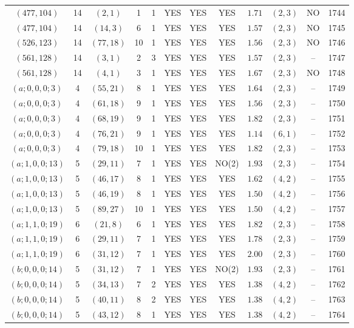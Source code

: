 \begin{longtable}{|c|c|c|c|c|c|c|c|c|c|c|c|}
$(477,104)$ & 14 & $(2,1)$ & 1 & 1 & YES & YES & YES & $1.71$ & $(2,3)$ & NO & 1744\\
$(477,104)$ & 14 & $(14,3)$ & 6 & 1 & YES & YES & YES & $1.57$ & $(2,3)$ & NO & 1745\\
$(526,123)$ & 14 & $(77,18)$ & 10 & 1 & YES & YES & YES & $1.56$ & $(2,3)$ & NO & 1746\\
$(561,128)$ & 14 & $(3,1)$ & 2 & 3 & YES & YES & YES & $1.57$ & $(2,3)$ & -- & 1747\\
$(561,128)$ & 14 & $(4,1)$ & 3 & 1 & YES & YES & YES & $1.67$ & $(2,3)$ & NO & 1748\\
$(a;0,0,0;3)$ & 4 & $(55,21)$ & 8 & 1 & YES & YES & YES & $1.64$ & $(2,3)$ & -- & 1749\\
$(a;0,0,0;3)$ & 4 & $(61,18)$ & 9 & 1 & YES & YES & YES & $1.56$ & $(2,3)$ & -- & 1750\\
$(a;0,0,0;3)$ & 4 & $(68,19)$ & 9 & 1 & YES & YES & YES & $1.82$ & $(2,3)$ & -- & 1751\\
$(a;0,0,0;3)$ & 4 & $(76,21)$ & 9 & 1 & YES & YES & YES & $1.14$ & $(6,1)$ & -- & 1752\\
$(a;0,0,0;3)$ & 4 & $(79,18)$ & 10 & 1 & YES & YES & YES & $1.82$ & $(2,3)$ & -- & 1753\\
$(a;1,0,0;13)$ & 5 & $(29,11)$ & 7 & 1 & YES & YES & NO(2) & $1.93$ & $(2,3)$ & -- & 1754\\
$(a;1,0,0;13)$ & 5 & $(46,17)$ & 8 & 1 & YES & YES & YES & $1.62$ & $(4,2)$ & -- & 1755\\
$(a;1,0,0;13)$ & 5 & $(46,19)$ & 8 & 1 & YES & YES & YES & $1.50$ & $(4,2)$ & -- & 1756\\
$(a;1,0,0;13)$ & 5 & $(89,27)$ & 10 & 1 & YES & YES & YES & $1.50$ & $(4,2)$ & -- & 1757\\
$(a;1,1,0;19)$ & 6 & $(21,8)$ & 6 & 1 & YES & YES & YES & $1.82$ & $(2,3)$ & -- & 1758\\
$(a;1,1,0;19)$ & 6 & $(29,11)$ & 7 & 1 & YES & YES & YES & $1.78$ & $(2,3)$ & -- & 1759\\
$(a;1,1,0;19)$ & 6 & $(31,12)$ & 7 & 1 & YES & YES & YES & $2.00$ & $(2,3)$ & -- & 1760\\
$(b;0,0,0;14)$ & 5 & $(31,12)$ & 7 & 1 & YES & YES & NO(2) & $1.93$ & $(2,3)$ & -- & 1761\\
$(b;0,0,0;14)$ & 5 & $(34,13)$ & 7 & 2 & YES & YES & YES & $1.38$ & $(4,2)$ & -- & 1762\\
$(b;0,0,0;14)$ & 5 & $(40,11)$ & 8 & 2 & YES & YES & YES & $1.38$ & $(4,2)$ & -- & 1763\\
$(b;0,0,0;14)$ & 5 & $(43,12)$ & 8 & 1 & YES & YES & YES & $1.38$ & $(4,2)$ & -- & 1764\\

\end{longtable}
